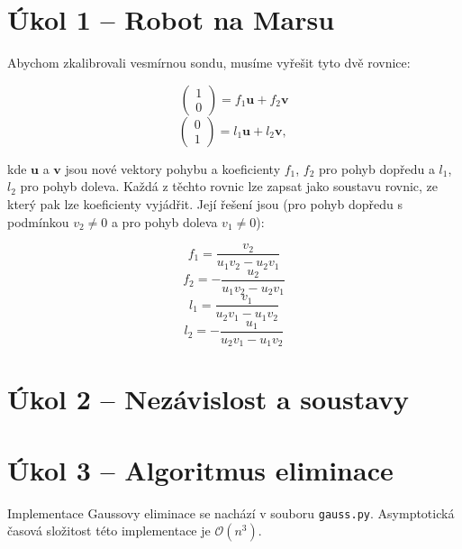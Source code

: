 \documentclass{fkssolpub}
\author{Ondřej Sedláček}
\begin{document}
\section{Úkol 1 -- Robot na Marsu}

Abychom zkalibrovali vesmírnou sondu, musíme vyřešit tyto dvě rovnice:

\[
  \begin{pmatrix}
    1 \\ 0
  \end{pmatrix} = f_1 \mathbf{u} + f_2 \mathbf{v} 
\]
\[
  \begin{pmatrix}
    0 \\ 1
  \end{pmatrix} = l_1 \mathbf{u} + l_2 \mathbf{v} \text{, }
\]

kde $\mathbf{u}$ a $\mathbf{v}$ jsou nové vektory pohybu a koeficienty
$f_1$, $f_2$ pro pohyb dopředu a $l_1$, $l_2$ pro pohyb doleva. Každá z těchto
rovnic lze zapsat jako soustavu rovnic, ze který pak lze koeficienty vyjádřit.
Její řešení jsou (pro pohyb dopředu s podmínkou $v_2 \neq 0$ a pro pohyb doleva
$v_1 \neq 0$):

\[
  f_1 = \frac{v_2}{u_1 v_2 - u_2 v_1}
\]
\[
  f_2 = -\frac{u_2}{u_1 v_2 - u_2 v_1}
\]
\[
  l_1 = \frac{v_1}{u_2 v_1 - u_1 v_2}
\]
\[
  l_2 = - \frac{u_1}{u_2 v_1 - u_1 v_2}
\]

\section{Úkol 2 -- Nezávislost a soustavy}



\section{Úkol 3 -- Algoritmus eliminace}

Implementace Gaussovy eliminace se nachází v souboru \verb|gauss.py|.
Asymptotická časová složitost této implementace je $\mathcal{O}(n^3)$.
\end{document}
